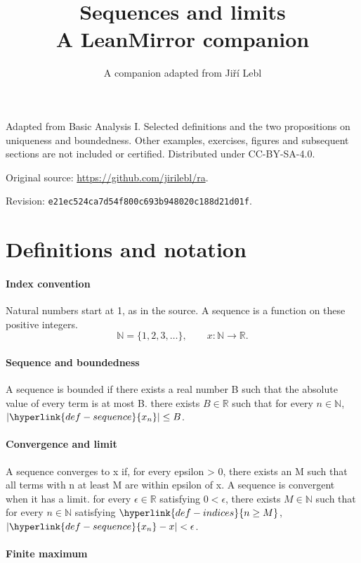 \documentclass[11pt]{article}
\begin{document}
\title{Sequences and limits\\\large A LeanMirror companion}
\author{A companion adapted from Jiří Lebl}
\date{}
\maketitle
Adapted from Basic Analysis I. Selected definitions and the two propositions on uniqueness and boundedness. Other examples, exercises, figures and subsequent sections are not included or certified. Distributed under CC-BY-SA-4.0.

Original source: \url{https://github.com/jirilebl/ra}.\par
Revision: \texttt{e21ec524ca7d54f800c693b948020c188d21d01f}.
\section*{Definitions and notation}
\hypertarget{def-indices}{}\paragraph{Index convention}
Natural numbers start at 1, as in the source. A sequence is a function on these positive integers.
\[ \mathbb{N}=\{1,2,3,\ldots\},\qquad x:\mathbb{N}\to\mathbb{R}. \]
\hypertarget{def-sequence}{}\paragraph{Sequence and boundedness}
A sequence is bounded if there exists a real number B such that the absolute value of every term is at most B.
there exists $B\in \mathbb{R}$ such that for every $n\in \mathbb{N}$, $\left|\hyperlink{def-sequence}{x_{n}}\right| \le B$.
\hypertarget{def-convergence}{}\paragraph{Convergence and limit}
A sequence converges to x if, for every epsilon > 0, there exists an M such that all terms with n at least M are within epsilon of x. A sequence is convergent when it has a limit.
for every $\epsilon\in \mathbb{R}$ satisfying $0 < \epsilon$, there exists $M\in \mathbb{N}$ such that for every $n\in \mathbb{N}$ satisfying $\hyperlink{def-indices}{n\ge M}$, $\left|\hyperlink{def-sequence}{x_{n}} - x\right| < \epsilon$.
\hypertarget{def-maximum}{}\paragraph{Finite maximum}
\end{document}
